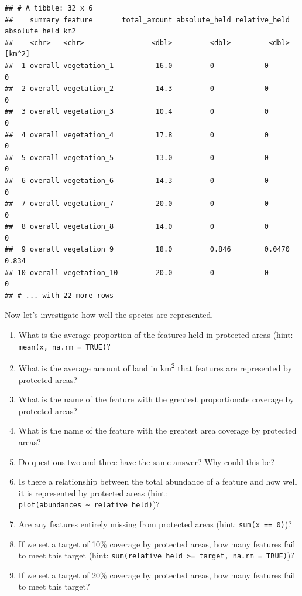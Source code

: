 \documentclass[
  12pt,
]{book}
\makeatletter
\providecommand{\tightlist}{%
  \setlength{\itemsep}{0pt}\setlength{\parskip}{0pt}}
\newenvironment{kframe}{%
\medskip{}
\setlength{\fboxsep}{.8em}
 \def\at@end@of@kframe{}%
 \ifinner\ifhmode%
  \def\at@end@of@kframe{\end{minipage}}%
  \begin{minipage}{\columnwidth}%
 \fi\fi%
 \def\FrameCommand##1{\hskip\@totalleftmargin \hskip-\fboxsep
 \colorbox{shadecolor}{##1}\hskip-\fboxsep
     \hskip-\linewidth \hskip-\@totalleftmargin \hskip\columnwidth}%
 \MakeFramed {\advance\hsize-\width
   \@totalleftmargin\z@ \linewidth\hsize
   \@setminipage}}%
 {\par\unskip\endMakeFramed%
 \at@end@of@kframe}
\newenvironment{rmdblock}[1]
  {
  \begin{itemize}
  \renewcommand{\labelitemi}{
    \raisebox{-.7\height}[0pt][0pt]{
      {\setkeys{Gin}{width=3em,keepaspectratio}\texttt{[image: images/\#1]}}
    }
  }
  \setlength{\fboxsep}{1em}
  \begin{kframe}
  \item
  }
  {
  \end{kframe}
  \end{itemize}
  }
\newenvironment{rmdquestion}
  {\begin{rmdblock}{question}}
  {\end{rmdblock}}
\makeatother
\begin{document}
\begin{verbatim}
## # A tibble: 32 x 6
##    summary feature       total_amount absolute_held relative_held absolute_held_km2
##    <chr>   <chr>                <dbl>         <dbl>         <dbl>            [km^2]
##  1 overall vegetation_1          16.0         0            0                  0    
##  2 overall vegetation_2          14.3         0            0                  0    
##  3 overall vegetation_3          10.4         0            0                  0    
##  4 overall vegetation_4          17.8         0            0                  0    
##  5 overall vegetation_5          13.0         0            0                  0    
##  6 overall vegetation_6          14.3         0            0                  0    
##  7 overall vegetation_7          20.0         0            0                  0    
##  8 overall vegetation_8          14.0         0            0                  0    
##  9 overall vegetation_9          18.0         0.846        0.0470             0.834
## 10 overall vegetation_10         20.0         0            0                  0    
## # ... with 22 more rows
\end{verbatim}

Now let's investigate how well the species are represented.

\begin{rmdquestion}
\begin{enumerate}
\def\labelenumi{\arabic{enumi}.}
\tightlist
\item
  What is the average proportion of the features held in protected areas (hint: \texttt{mean(x,\ na.rm\ =\ TRUE)}?
\item
  What is the average amount of land in km\textsuperscript{2} that features are represented by protected areas?
\item
  What is the name of the feature with the greatest proportionate coverage by protected areas?
\item
  What is the name of the feature with the greatest area coverage by protected areas?
\item
  Do questions two and three have the same answer? Why could this be?
\item
  Is there a relationship between the total abundance of a feature and how well it is represented by protected areas (hint: \texttt{plot(abundances\ \textasciitilde{}\ relative\_held)})?
\item
  Are any features entirely missing from protected areas (hint: \texttt{sum(x\ ==\ 0)})?
\item
  If we set a target of 10\% coverage by protected areas, how many features fail to meet this target (hint: \texttt{sum(relative\_held\ \textgreater{}=\ target,\ na.rm\ =\ TRUE)})?
\item
  If we set a target of 20\% coverage by protected areas, how many features fail to meet this target?
\end{enumerate}
\end{rmdquestion}
\end{document}
